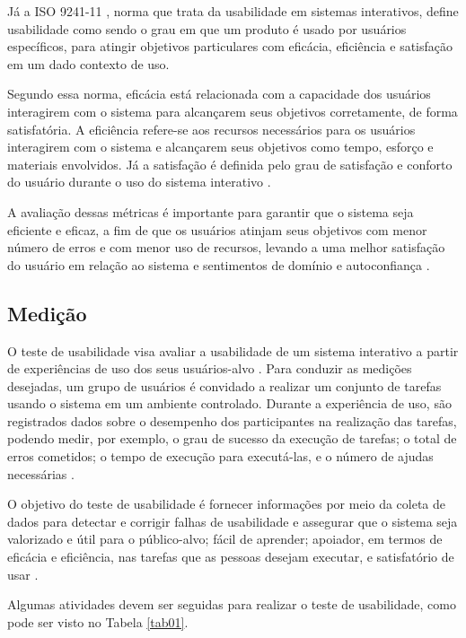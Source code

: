 Já a ISO 9241-11 \cite{iso9241}, norma que trata da usabilidade em sistemas interativos, define usabilidade como sendo o grau em que 
um produto é usado por usuários específicos, para atingir objetivos particulares com eficácia, eficiência e satisfação em um dado contexto 
de uso.

Segundo essa norma, eficácia está relacionada com a capacidade dos usuários interagirem com o sistema para alcançarem seus objetivos 
corretamente, de forma satisfatória. A eficiência refere-se aos recursos necessários para os usuários interagirem 
com o sistema e alcançarem seus objetivos como tempo, esforço e materiais envolvidos. Já a satisfação é definida pelo grau de satisfação e 
conforto do usuário durante o uso do sistema interativo \cite{iso9241}.

A avaliação dessas métricas é importante para garantir que o sistema seja eficiente e eficaz, a fim de que os usuários atinjam seus objetivos 
com menor número de erros e com menor uso de recursos, levando a uma melhor satisfação do usuário em relação ao sistema e sentimentos de domínio 
e autoconfiança \cite{nielsen1994usability}.

\subsection{Medição}
\label{sec:Medição1}

O teste de usabilidade visa avaliar a usabilidade de um sistema interativo a partir de experiências de uso dos seus usuários-alvo \cite{rubin2011}. 
Para conduzir as medições desejadas, um grupo de usuários é convidado a realizar um conjunto de tarefas usando o sistema em um ambiente controlado. Durante a experiência de 
uso, são registrados dados sobre o desempenho dos participantes na realização das tarefas, podendo medir, por exemplo, o grau de sucesso da execução de tarefas; o total de 
erros cometidos; o tempo de execução para executá-las, e o número de ajudas necessárias \cite{barbosa2010}.

O objetivo do teste de usabilidade é fornecer informações por meio da coleta de dados para detectar e corrigir falhas de usabilidade e assegurar que o sistema seja valorizado 
e útil para o público-alvo; fácil de aprender; apoiador, em termos de eficácia e eficiência, nas tarefas que as pessoas desejam executar, e satisfatório de usar \cite{rubin2011}. 

Algumas atividades devem ser seguidas para realizar o teste de usabilidade, como pode ser visto no Tabela \ref{tab01}.

